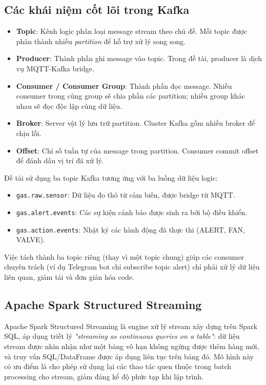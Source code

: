 \subsection{Các khái niệm cốt lõi trong Kafka}

\begin{itemize}
  \item \textbf{Topic}: Kênh logic phân loại message stream theo chủ đề. Mỗi topic được phân thành nhiều \textit{partition} để hỗ trợ xử lý song song.
  \item \textbf{Producer}: Thành phần ghi message vào topic. Trong đề tài, producer là dịch vụ MQTT-Kafka bridge.
  \item \textbf{Consumer / Consumer Group}: Thành phần đọc message. Nhiều consumer trong cùng group sẽ chia phần các partition; nhiều group khác nhau sẽ đọc độc lập cùng dữ liệu.
  \item \textbf{Broker}: Server vật lý lưu trữ partition. Cluster Kafka gồm nhiều broker để chịu lỗi.
  \item \textbf{Offset}: Chỉ số tuần tự của message trong partition. Consumer commit offset để đánh dấu vị trí đã xử lý.
\end{itemize}

Đề tài sử dụng ba topic Kafka tương ứng với ba luồng dữ liệu logic:
\begin{itemize}
  \item \texttt{gas.raw.sensor}: Dữ liệu đo thô từ cảm biến, được bridge từ MQTT.
  \item \texttt{gas.alert.events}: Các sự kiện cảnh báo được sinh ra bởi bộ điều khiển.
  \item \texttt{gas.action.events}: Nhật ký các hành động đã thực thi (ALERT, FAN, VALVE).
\end{itemize}

Việc tách thành ba topic riêng (thay vì một topic chung) giúp các consumer chuyên trách (ví dụ Telegram bot chỉ subscribe topic alert) chỉ phải xử lý dữ liệu liên quan, giảm tải và đơn giản hóa code.

\subsection{Apache Spark Structured Streaming}

Apache Spark Structured Streaming là engine xử lý stream xây dựng trên Spark SQL, áp dụng triết lý \textit{"streaming as continuous queries on a table"}: dữ liệu stream được nhìn nhận như một bảng vô hạn không ngừng được thêm hàng mới, và truy vấn SQL/DataFrame được áp dụng liên tục trên bảng đó. Mô hình này có ưu điểm là cho phép sử dụng lại các thao tác quen thuộc trong batch processing cho stream, giảm đáng kể độ phức tạp khi lập trình.

